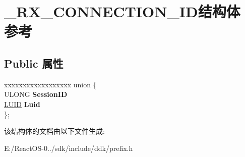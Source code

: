\hypertarget{struct___r_x___c_o_n_n_e_c_t_i_o_n___i_d}{}\section{\+\_\+\+R\+X\+\_\+\+C\+O\+N\+N\+E\+C\+T\+I\+O\+N\+\_\+\+I\+D结构体 参考}
\label{struct___r_x___c_o_n_n_e_c_t_i_o_n___i_d}
\subsection*{Public 属性}
\begin{DoxyCompactItemize}
\item 
\mbox{\label{struct___r_x___c_o_n_n_e_c_t_i_o_n___i_d_ac786b964dd86ec0a953d0f61bd2a454b}} 
\begin{tabbing}
xx\=xx\=xx\=xx\=xx\=xx\=xx\=xx\=xx\=\kill
union \{\\
\>ULONG {\bfseries SessionID}\\
\>\hyperlink{struct___l_u_i_d}{LUID} {\bfseries Luid}\\
\}; \\

\end{tabbing}\end{DoxyCompactItemize}


该结构体的文档由以下文件生成\+:\begin{DoxyCompactItemize}
\item 
E\+:/\+React\+O\+S-\/0../sdk/include/ddk/prefix.\+h\end{DoxyCompactItemize}
